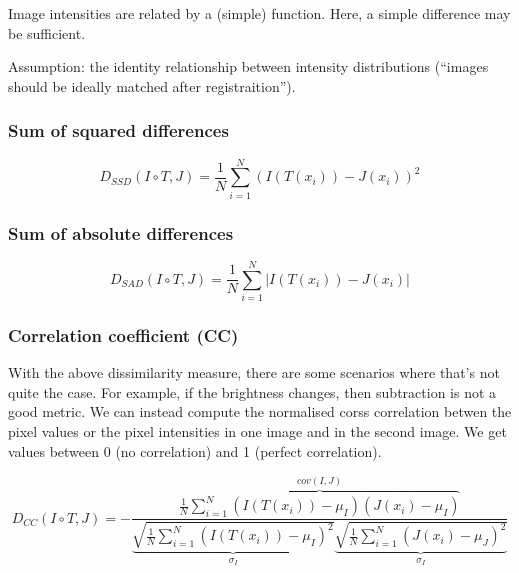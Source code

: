 \documentclass[11pt]{article}
\begin{document}
Image intensities are related by a (simple) function. Here, a simple difference may be sufficient.

Assumption: the identity relationship between intensity distributions (``images should be ideally matched after registraition'').  

\subsubsection{Sum of squared differences}

\begin{equation}
    D_{SSD}(I \circ T,J) = \frac 1 N  \sum^N_{i=1} (I(T(x_i))-J(x_i))^2
\end{equation}

\subsubsection{Sum of absolute differences}

\begin{equation}
    D_{SAD}(I \circ T,J) = \frac 1 N  \sum^N_{i=1} |I(T(x_i))-J(x_i)|
\end{equation}

\subsubsection{Correlation coefficient (CC)}

With the above dissimilarity measure, there are some scenarios where that's not quite the case. For example, if the brightness changes, then subtraction is not a good metric. We can instead compute the normalised corss correlation betwen the pixel values or the pixel intensities in one image and in the second image. We get values between 0 (no correlation) and 1 (perfect correlation).

\begin{equation}
    D_{CC}(I \circ T,J)=-\frac{
\overbrace{
   \frac{1}{N} \sum^N_{i=1}(I(T(x_i))-\mu_I)(J(x_i)-\mu_I)
}^{cov(I,J)}
}{
\underbrace{
\sqrt{\frac 1 N \sum^N_{i=1}(I(T(x_i))-\mu_I)^2
}
}_{\sigma_I}
\underbrace{
\sqrt{\frac 1 N \sum^N_{i=1}(J(x_i)-\mu_J)^2
}
}_{\sigma_I}
}
\end{equation}

\begin{figure}[H]
    \centering
\end{figure}
\end{document}
